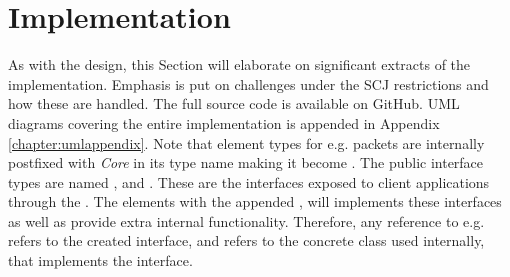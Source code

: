 \section{Implementation}
As with the design, this Section will elaborate on significant extracts of the implementation. Emphasis is put on challenges under the SCJ restrictions and how these are handled. The full source code is available on GitHub\cite{SW902e12:CSPinSCJ}. UML diagrams covering the entire implementation is appended in Appendix \ref{chapter:umlappendix}. Note that element types for e.g. packets are internally postfixed with \textit{Core} in its type name making it become . The public interface types are named ,  and . These are the interfaces exposed to client applications through the . The elements with the appended , will implements these interfaces as well as provide extra internal functionality. Therefore, any reference to e.g.  refers to the created interface, and  refers to the concrete class used internally, that implements the interface.